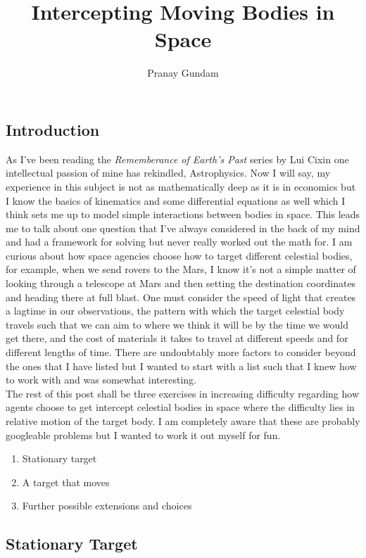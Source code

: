 \documentclass[11pt,english]{article}
\title{\textbf{Intercepting Moving Bodies in Space}}
\author{Pranay Gundam}
\begin{document}
\maketitle

\subsection*{Introduction}

\noindent As I've been reading the \textit{Rememberance of Earth's Past} series by Lui Cixin one intellectual passion of mine has rekindled, Astrophysics. Now I will say, my experience in this subject is not as mathematically deep as it is in economics but I know the basics of kinematics and some differential equations as well which I think sets me up to model simple interactions between bodies in space. This leads me to talk about one question that I've always considered in the back of my mind and had a framework for solving but never really worked out the math for. I am curious about how space agencies choose how to target different celestial bodies, for example, when we send rovers to the Mars, I know it's not a simple matter of looking through a telescope at Mars and then setting the destination coordinates and heading there at full blast. One must consider the speed of light that creates a lagtime in our observations, the pattern with which the target celestial body travels such that we can aim to where we think it will be by the time we would get there, and the cost of materials it takes to travel at different speeds and for different lengths of time. There are undoubtably more factors to consider beyond the ones that I have listed but I wanted to start with a list such that I knew how to work with and was somewhat interesting.\\

\noindent The rest of this post shall be three exercises in increasing difficulty regarding how agents choose to get intercept celestial bodies in space where the difficulty lies in relative motion of the target body. I am completely aware that these are probably googleable problems but I wanted to work it out myself for fun.
\begin{enumerate}
	\item Stationary target 
	\item A target that moves 
	\item Further possible extensions and choices
\end{enumerate}

\subsection*{Stationary Target}
\end{document}
